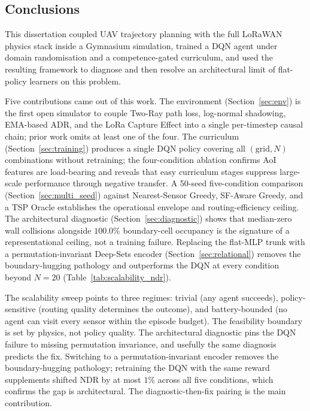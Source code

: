 \subsection{Conclusions}

This dissertation coupled UAV trajectory planning with the full LoRaWAN physics stack inside a Gymnasium simulation, trained a DQN agent under domain randomisation and a competence-gated curriculum, and used the resulting framework to diagnose and then resolve an architectural limit of flat-policy learners on this problem.

Five contributions came out of this work. The environment (Section~\ref{sec:env}) is the first open simulator to couple Two-Ray path loss, log-normal shadowing, EMA-based ADR, and the LoRa Capture Effect into a single per-timestep causal chain; prior work omits at least one of the four. The curriculum (Section~\ref{sec:training}) produces a single DQN policy covering all $(\text{grid}, N)$ combinations without retraining; the four-condition ablation confirms AoI features are load-bearing and reveals that easy curriculum stages suppress large-scale performance through negative transfer. A 50-seed five-condition comparison (Section~\ref{sec:multi_seed}) against Nearest-Sensor Greedy, SF-Aware Greedy, and a TSP Oracle establishes the operational envelope and routing-efficiency ceiling. The architectural diagnostic (Section~\ref{sec:diagnostic}) shows that median-zero wall collisions alongside $100.0\%$ boundary-cell occupancy is the signature of a representational ceiling, not a training failure. Replacing the flat-MLP trunk with a permutation-invariant Deep-Sets encoder (Section~\ref{sec:relational}) removes the boundary-hugging pathology and outperforms the DQN at every condition beyond $N{=}20$ (Table~\ref{tab:scalability_ndr}).

The scalability sweep points to three regimes: trivial (any agent succeeds), policy-sensitive (routing quality determines the outcome), and battery-bounded (no agent can visit every sensor within the episode budget). The feasibility boundary is set by physics, not policy quality. The architectural diagnostic pins the DQN failure to missing permutation invariance, and usefully the same diagnosis predicts the fix. Switching to a permutation-invariant encoder removes the boundary-hugging pathology; retraining the DQN with the same reward supplements shifted NDR by at most $1\%$ across all five conditions, which confirms the gap is architectural. The diagnostic-then-fix pairing is the main contribution.

